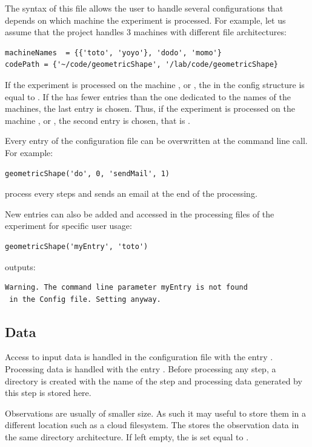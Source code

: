 \documentclass[a4paper,fleqn]{tufte-handout}
\begin{document}
The syntax of this file allows the user to handle several configurations that depends on which machine the experiment is processed. For example, let us assume that the project handles 3 machines with different file architectures:
\begin{lstlisting}
machineNames  = {{'toto', 'yoyo'}, 'dodo', 'momo'}
codePath = {'~/code/geometricShape', '/lab/code/geometricShape}
\end{lstlisting}
If the experiment is processed on the machine , or , the  in the config structure is equal to .  If the  has fewer entries than the one dedicated to the names of the machines, the last entry is chosen. Thus, if the experiment is processed on the machine , or , the second entry is chosen, that is .

Every entry of the configuration file can be overwritten at the command line call. For example:
\begin{lstlisting}
geometricShape('do', 0, 'sendMail', 1)
\end{lstlisting}
process every steps and sends an email at the end of the processing.

New entries can also be added and accessed in the processing files of the experiment for specific user usage:
\begin{lstlisting}
geometricShape('myEntry', 'toto')
\end{lstlisting}
outputs:
\begin{lstlisting}
Warning. The command line parameter myEntry is not found
 in the Config file. Setting anyway.
\end{lstlisting}


\subsection{Data}

Access to input data is handled in the configuration file with the entry . Processing data is handled with the entry . Before processing any step, a directory is created with the name of the step and processing data generated by this step is stored here.

Observations are usually of smaller size. As such it may useful to store them in a different location such as a cloud filesystem. The  stores the observation data in the same directory architecture. If left empty, the  is set equal to .
\end{document}
